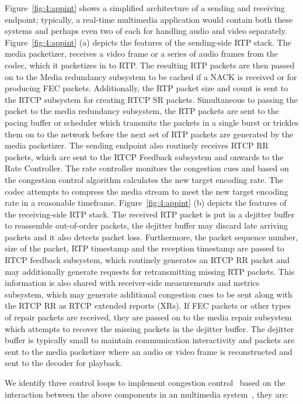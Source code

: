Figure~\ref{fig:4:appint} shows a simplified architecture of a sending and
receiving endpoint; typically, a real-time multimedia application would
contain both these systems and perhaps even two of each for handling audio and
video separately. Figure~\ref{fig:4:appint} (a) depicts the features of the
sending-side RTP stack. The media packetizer, receives a video frame or a
series of audio frames from the codec, which it packetizes in to RTP.  The
resulting RTP packets are then passed on to the Media redundancy subsystem to
be cached if a NACK is received or for producing FEC packets. Additionally,
the RTP packet size and count is sent to the RTCP subsystem for creating RTCP
SR packets. Simultaneous to passing the packet to the media redundancy
subsystem, the RTP packets are sent to the pacing buffer or scheduler which
transmits the packets in a single burst or trickles them on to the network
before the next set of RTP packets are generated by the media packetizer. The
sending endpoint also routinely receives RTCP RR packets, which are sent to
the RTCP Feedback  subsystem and onwards to the Rate Controller. The rate
controller monitors the congestion cues and based on the congestion control
algorithm calculates the  new target encoding rate. The codec attempts to
compress the media stream to meet the new target encoding rate in a reasonable
timeframe. Figure~\ref{fig:4:appint} (b) depicts the features of the
receiving-side RTP stack. The received RTP packet is put in a dejitter buffer
to reassemble out-of-order packets, the dejitter buffer may discard late
arriving packets and it also detects packet loss. Furthermore, the packet
sequence number,  size of the packet, RTP timestamp and the reception
timestamp are passed to RTCP feedback subsystem, which routinely generates an
RTCP RR packet and may additionally generate requests for retransmitting
missing RTP packets. This information is also shared with receiver-side
measurements and metrics subsystem, which may generate additional congestion
cues to be sent along with the RTCP RR as RTCP extended reports (XRs). If FEC
packets or other types of repair packets are received, they are passed on to
the media repair subsystem which attempts to recover the missing packets in
the dejitter buffer. The dejitter buffer is typically small to maintain
communication interactivity and packets are sent to the media packetizer where
an audio or video frame is reconstructed and sent to the decoder for playback.


We identify three control loops to implement congestion
control~\cite{Singh:control.loops.api} based on the interaction between the
above components in an multimedia system~\cite{draft.rmcat.app.interaction},
they are:


